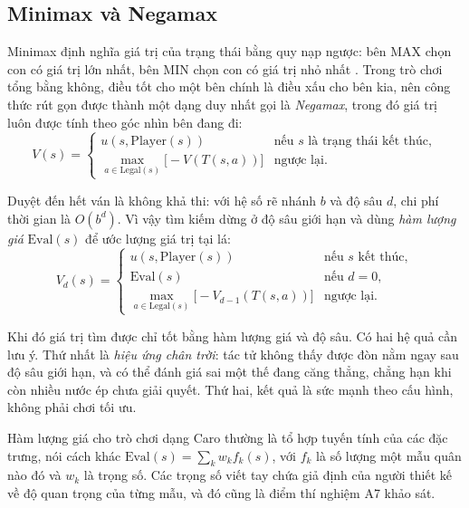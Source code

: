 \subsection{Minimax và Negamax}
\label{sec:lt-negamax}
Minimax định nghĩa giá trị của trạng thái bằng quy nạp ngược: bên MAX chọn con có giá trị lớn nhất, bên MIN chọn con có giá trị nhỏ nhất \cite{russell2021aima}. Trong trò chơi tổng bằng không, điều tốt cho một bên chính là điều xấu cho bên kia, nên công thức rút gọn được thành một dạng duy nhất gọi là \emph{Negamax}, trong đó giá trị luôn được tính theo góc nhìn bên đang đi:
\begin{equation}
  V(s) =
  \begin{cases}
    u(s, \text{Player}(s)) & \text{nếu } s \text{ là trạng thái kết thúc}, \\
    \max\limits_{a \in \text{Legal}(s)} \big[ -V(T(s, a)) \big] & \text{ngược lại}.
  \end{cases}
  \label{eq:negamax}
\end{equation}

Duyệt đến hết ván là không khả thi: với hệ số rẽ nhánh $b$ và độ sâu $d$, chi phí thời gian là $O(b^d)$. Vì vậy tìm kiếm dừng ở độ sâu giới hạn và dùng \emph{hàm lượng giá} $\text{Eval}(s)$ để ước lượng giá trị tại lá:
\begin{equation}
  V_d(s) =
  \begin{cases}
    u(s, \text{Player}(s)) & \text{nếu } s \text{ kết thúc}, \\
    \text{Eval}(s) & \text{nếu } d = 0, \\
    \max\limits_{a \in \text{Legal}(s)} \big[ -V_{d-1}(T(s, a)) \big] & \text{ngược lại}.
  \end{cases}
\end{equation}

Khi đó giá trị tìm được chỉ tốt bằng hàm lượng giá và độ sâu. Có hai hệ quả cần lưu ý. Thứ nhất là \emph{hiệu ứng chân trời}: tác tử không thấy được đòn nằm ngay sau độ sâu giới hạn, và có thể đánh giá sai một thế đang căng thẳng, chẳng hạn khi còn nhiều nước ép chưa giải quyết. Thứ hai, kết quả là sức mạnh theo cấu hình, không phải chơi tối ưu.

Hàm lượng giá cho trò chơi dạng Caro thường là tổ hợp tuyến tính của các đặc trưng, nói cách khác $\text{Eval}(s) = \sum_k w_k f_k(s)$, với $f_k$ là số lượng một mẫu quân nào đó và $w_k$ là trọng số. Các trọng số viết tay chứa giả định của người thiết kế về độ quan trọng của từng mẫu, và đó cũng là điểm thí nghiệm A7 khảo sát.

